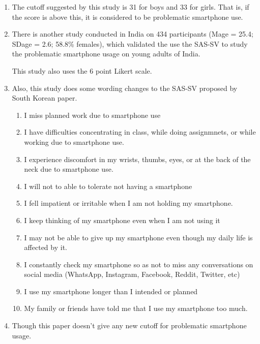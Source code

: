 \documentclass{article}
\begin{document}
\begin{enumerate}
\begin{enumerate}
        \item Having my smartphone in my mind even when I am not using it
        \item I will never give up using my smartphone even when my daily life is already greatly affected by it.
        \item Constantly checking my smartphone so as not to miss conversations between other people on Twitter or Facebook
        \item Using my smartphone longer than I had intented
        \item The people around me tell me that I use my smartphone too much
    \end{enumerate}
    \item The cutoff suggested by this study is 31 for boys and 33 for girls. That is, if the score is above this, it is considered to be problematic smartphone use.
    \item There is another study \cite{SAS_SV_India} conducted in India on 434 participants (Mage = 25.4; SDage = 2.6; 58.8\% females), 
    which validated the use the SAS-SV to study the problematic smartphone usage on young adults of India.

    This study also uses the 6 point Likert scale.

    \item Also, this study does some wording changes to the SAS-SV proposed by South Korean paper.
    \begin{enumerate}
        \item I miss planned work due to smartphone use
        \item I have difficulties concentrating in class, while doing assignmnets, or while working due to smartphone use.
        \item I experience discomfort in my wrists, thumbs, eyes, or at the back of the neck due to smartphone use.
        \item I will not to able to tolerate not having a smartphone
        \item I fell impatient or irritable when I am not holding my smartphone.
        \item I keep thinking of my smartphone even when I am not using it
        \item I may not be able to give up my smartphone even though my daily life is affected by it.
        \item I constantly check my smartphone so as not to miss any conversations on social media (WhatsApp, Instagram, Facebook, Reddit, Twitter, etc)
        \item I use my smartphone longer than I intended or planned
        \item My family or friends have told me that I use my smartphone too much. 
    \end{enumerate}
    \item Though this paper doesn't give any new cutoff for problematic smartphone usage.
    

\end{enumerate}
\end{document}
